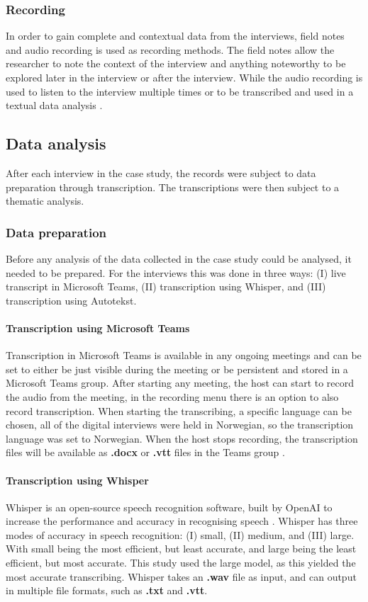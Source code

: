 \subsubsection{Recording}
In order to gain complete and contextual data from the interviews, field notes and audio recording is used as recording methods. The field notes allow the researcher to note the context of the interview and anything noteworthy to be explored later in the interview or after the interview. While the audio recording is used to listen to the interview multiple times or to be transcribed and used in a textual data analysis \cite{bjo_2022}.

\subsection{Data analysis}
After each interview in the case study, the records were subject to data preparation through transcription. The transcriptions were then subject to a thematic analysis.

\subsubsection{Data preparation}
Before any analysis of the data collected in the case study could be analysed, it needed to be prepared. For the interviews this was done in three ways: (I) live transcript in Microsoft Teams, (II) transcription using Whisper, and (III) transcription using Autotekst.

\paragraph{Transcription using Microsoft Teams}
Transcription in Microsoft Teams is available in any ongoing meetings and can be set to either be just visible during the meeting or be persistent and stored in a Microsoft Teams group. After starting any meeting, the host can start to record the audio from the meeting, in the recording menu there is an option to also record transcription. When starting the transcribing, a specific language can be chosen, all of the digital interviews were held in Norwegian, so the transcription language was set to Norwegian. When the host stops recording, the transcription files will be available as \textbf{.docx} or \textbf{.vtt} files in the Teams group \cite{mt_2022}.

\paragraph{Transcription using Whisper}
Whisper is an open-source speech recognition software, built by OpenAI to increase the performance and accuracy in recognising speech \cite{oa_2022}. Whisper has three modes of accuracy in speech recognition: (I) small, (II) medium, and (III) large. With small being the most efficient, but least accurate, and large being the least efficient, but most accurate. This study used the large model, as this yielded the most accurate transcribing. Whisper takes an \textbf{.wav} file as input, and can output in multiple file formats, such as \textbf{.txt} and \textbf{.vtt}.

